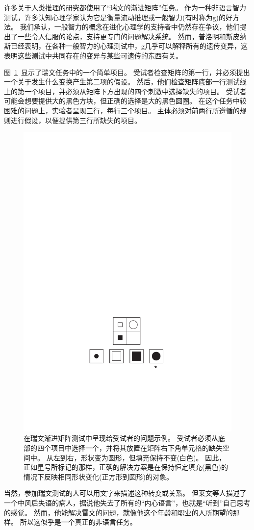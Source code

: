 许多关于人类推理的研究都使用了“瑞文的渐进矩阵”任务\cite{raven1983manual}。
作为一种非语言智力测试，许多认知心理学家认为它是衡量流动推理\cite{cattell1973technical}或一般智力(有时称为g)的好方法\cite{duncan2010intelligence}。
我们承认，一般智力的概念在进化心理学的支持者中仍然存在争议，他们提出了一些令人信服的论点，支持更专门的问题解决系统。
然而，普洛明和斯皮纳斯\cite{plomin1999genetics}已经表明，在各种一般智力的心理测试中，g几乎可以解释所有的遗传变异，这表明这些测试中共同存在的变异与某些可遗传的东西有关。


图~\ref{fig:fig_9_8}~显示了瑞文任务中的一个简单项目。
受试者检查矩阵的第一行，并必须提出一个关于发生什么变换产生第二项的假设。
然后，他们检查矩阵底部一行测试线上的第一个项目，并必须从矩阵下方出现的四个刺激中选择缺失的项目。
受试者可能会想要提供大的黑色方块，但正确的选择是大的黑色圆圈。
在这个任务中较困难的问题上，实验者呈现三行，每行三个项目。
主体必须对前两行所遵循的规则进行假设，以便提供第三行所缺失的项目。



\begin{figure}[!htb]
	\centering
	\includegraphics[width=0.5\linewidth]{chap9/9_8}
	\caption{在瑞文渐进矩阵测试中呈现给受试者的问题示例。
		受试者必须从底部的四个项目中选择一个，并将其放置在矩阵右下角单元格的缺失空间中。
		从左到右，形状变为圆形，但填充保持不变(白色)。
		因此，正如星号所标记的那样，正确的解决方案是在保持恒定填充(黑色)的情况下反映相同形状变化(正方形到圆形)的对象\cite{duncan2010intelligence}。\label{fig:fig_9_8}}
\end{figure}


当然，参加瑞文测试的人可以用文字来描述这种转变或关系。
但莱文等人\cite{levine1982language}描述了一个中风后失语的病人，据说他失去了所有的“内心语言”，也就是“听到”自己思考的感觉。
然而，他能解决雷文的问题，就像他这个年龄和职业的人所期望的那样。
所以这似乎是一个真正的非语言任务。


